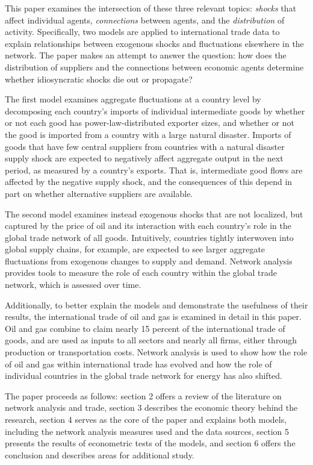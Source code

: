 \documentclass[10pt,letterpaper]{article}
\begin{document}
This paper examines the intersection of these three relevant topics: \textsl{shocks} that affect individual agents, \textsl{connections} between agents, and the \textsl{distribution} of activity. Specifically, two models are applied to international trade data to explain relationships between exogenous shocks and fluctuations elsewhere in the network. The paper makes an attempt to answer the question: how does the distribution of suppliers and the connections between economic agents determine whether idiosyncratic shocks die out or propagate?

The first model examines aggregate fluctuations at a country level by decomposing each country's imports of individual intermediate goods by whether or not each good has power-law-distributed exporter sizes, and whether or not the good is imported from a country with a large natural disaster. Imports of goods that have few central suppliers from countries with a natural disaster supply shock are expected to negatively affect aggregate output in the next period, as measured by a country's exports. That is, intermediate good flows are affected by the negative supply shock, and the consequences of this depend in part on whether alternative suppliers are available. 

The second model examines instead exogenous shocks that are not localized, but captured by the price of oil and its interaction with each country's role in the global trade network of all goods. Intuitively, countries tightly interwoven into global supply chains, for example, are expected to see larger aggregate fluctuations from exogenous changes to supply and demand. Network analysis provides tools to measure the role of each country within the global trade network, which is assessed over time.

Additionally, to better explain the models and demonstrate the usefulness of their results, the international trade of oil and gas is examined in detail in this paper. Oil and gas combine to claim nearly 15 percent of the international trade of goods, and are used as inputs to all sectors and nearly all firms, either through production or transportation costs. Network analysis is used to show how the role of oil and gas within international trade has evolved and how the role of individual countries in the global trade network for energy has also shifted. 

The paper proceeds as follows: section 2 offers a review of the literature on network analysis and trade, section 3 describes the economic theory behind the research, section 4 serves as the core of the paper and explains both models, including the network analysis measures used and the data sources, section 5 presents the results of econometric tests of the models, and section 6 offers the conclusion and describes areas for additional study.
\end{document}
